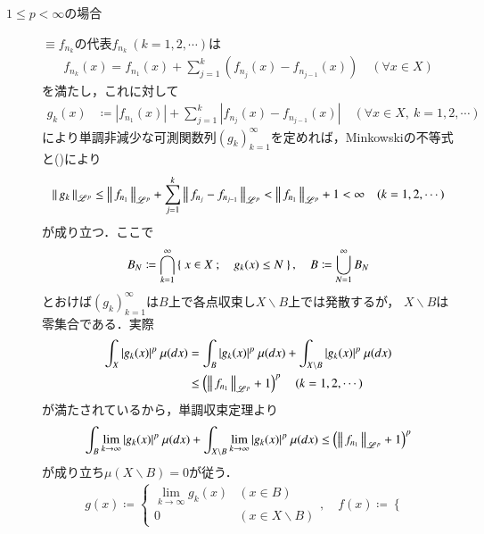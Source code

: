 \begin{prf}
\begin{description}
		\item[$1 \leq p < \infty$の場合]
			$\equiv{f_{n_k}}{}$の代表$f_{n_k}\ (k=1,2,\cdots)$は
			\begin{align}	
				f_{n_k}(x) = f_{n_1}(x) + \sum_{j=1}^{k}\left( f_{n_j}(x) - f_{n_{j-1}}(x) \right) \quad (\forall x \in X)
				\label{eq:Lp_banach_3}
			\end{align}
			を満たし，これに対して
			\begin{align}
				g_k(x) &\coloneqq \left| f_{n_1}(x) \right| + \sum_{j=1}^{k} \left| f_{n_j}(x) - f_{n_{j-1}}(x) \right|
				\quad (\forall x \in X,\ k=1,2,\cdots)
			\end{align}
			により単調非減少な可測関数列$(g_k)_{k=1}^{\infty}$を定めれば，Minkowskiの不等式と()により
			\begin{align}
				\left\|\, g_k\, \right\|_{\mathscr{L}^p} \leq \left\|\, f_{n_1}\, \right\|_{\mathscr{L}^p} + \sum_{j=1}^{k}\left\|\, f_{n_j} - f_{n_{j-1}}\, \right\|_{\mathscr{L}^p}
				< \left\|\, f_{n_1}\, \right\|_{\mathscr{L}^p} + 1 < \infty
				\quad (k = 1,2,\cdots)
				\label{eq:thm_Lp_banach_1}
			\end{align}
			が成り立つ．ここで
			\begin{align}
				B_N \coloneqq \bigcap_{k=1}^{\infty} \left\{\ x \in X\ ;\quad g_k(x) \leq N\ \right\},
				\quad B \coloneqq \bigcup_{N=1}^{\infty} B_N
			\end{align}
			とおけば$(g_k)_{k=1}^{\infty}$は$B$上で各点収束し$X \backslash B$上では発散するが，
			$X \backslash B$は零集合である．実際
			\begin{align}
				\int_X |g_k(x)|^p\ \mu(dx)
				&= \int_B |g_k(x)|^p\ \mu(dx) + \int_{X \backslash B} |g_k(x)|^p\ \mu(dx) \\
				&\leq \left( \left\|\, f_{n_1}\, \right\|_{\mathscr{L}^p} + 1 \right)^p
				\quad (k=1,2,\cdots)
			\end{align}
			が満たされているから，単調収束定理より
			\begin{align}
				\int_B \lim_{k \to \infty}|g_k(x)|^p\ \mu(dx) + \int_{X \backslash B} \lim_{k \to \infty}|g_k(x)|^p\ \mu(dx)
				\leq \left( \left\|\, f_{n_1}\, \right\|_{\mathscr{L}^p} + 1 \right)^p
			\end{align}
			が成り立ち$\mu(X \backslash B) = 0$が従う．
			\begin{align}
				g(x) \coloneqq
				\begin{cases}
					\lim\limits_{k \to \infty} g_k(x) & (x \in B) \\
					0 & (x \in X \backslash B)
				\end{cases}
				,\quad
				f(x) \coloneqq
				\begin{cases}

\end{cases}
\end{align}
\end{description}
\end{prf}
